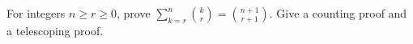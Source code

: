 For integers $n\ge r\ge0$, prove $\sum_{k=r}^n\binom kr=\binom{n+1}{r+1}$. Give a counting proof and a telescoping proof.
